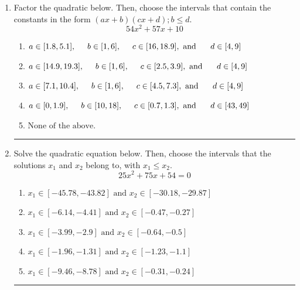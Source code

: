 \documentclass[14pt]{extbook}
\newcommand{\litem}[1]{\item#1\hspace*{-1cm}\rule{\textwidth}{0.4pt}}
\begin{document}
\begin{enumerate}
{\begin{enumerate}[label=\Alph*.]
\end{enumerate} }
\litem{
Factor the quadratic below. Then, choose the intervals that contain the constants in the form $(ax+b)(cx+d); b \leq d.$\[ 54x^{2} +57 x + 10 \]\begin{enumerate}[label=\Alph*.]
\item \( a \in [1.8, 5.1], \hspace*{5mm} b \in [1, 6], \hspace*{5mm} c \in [16, 18.9], \text{ and } \hspace*{5mm} d \in [4, 9] \)
\item \( a \in [14.9, 19.3], \hspace*{5mm} b \in [1, 6], \hspace*{5mm} c \in [2.5, 3.9], \text{ and } \hspace*{5mm} d \in [4, 9] \)
\item \( a \in [7.1, 10.4], \hspace*{5mm} b \in [1, 6], \hspace*{5mm} c \in [4.5, 7.3], \text{ and } \hspace*{5mm} d \in [4, 9] \)
\item \( a \in [0, 1.9], \hspace*{5mm} b \in [10, 18], \hspace*{5mm} c \in [0.7, 1.3], \text{ and } \hspace*{5mm} d \in [43, 49] \)
\item \( \text{None of the above.} \)

\end{enumerate} }
\litem{
Solve the quadratic equation below. Then, choose the intervals that the solutions $x_1$ and $x_2$ belong to, with $x_1 \leq x_2$.\[ 25x^{2} +75 x + 54 = 0 \]\begin{enumerate}[label=\Alph*.]
\item \( x_1 \in [-45.78, -43.82] \text{ and } x_2 \in [-30.18, -29.87] \)
\item \( x_1 \in [-6.14, -4.41] \text{ and } x_2 \in [-0.47, -0.27] \)
\item \( x_1 \in [-3.99, -2.9] \text{ and } x_2 \in [-0.64, -0.5] \)
\item \( x_1 \in [-1.96, -1.31] \text{ and } x_2 \in [-1.23, -1.1] \)
\item \( x_1 \in [-9.46, -8.78] \text{ and } x_2 \in [-0.31, -0.24] \)


\end{enumerate}}
\end{enumerate}
\end{document}
